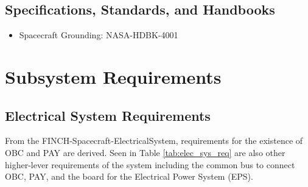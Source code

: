 \documentclass[12pt,a4paper]{article}
\begin{document}
    \subsection{Specifications, Standards, and Handbooks}
    \begin{itemize}
        \item Spacecraft Grounding: NASA-HDBK-4001
    \end{itemize}
   
    \newpage
    \section{Subsystem Requirements}\label{sec:requirements}

    \subsection{Electrical System Requirements}
    From the FINCH-Spacecraft-ElectricalSystem, requirements for the existence of OBC and PAY are derived. Seen in Table \ref{tab:elec_sys_req} are also other higher-lever requirements of the system including the common bus to connect OBC, PAY, and the board for the Electrical Power System (EPS).
\end{document}
